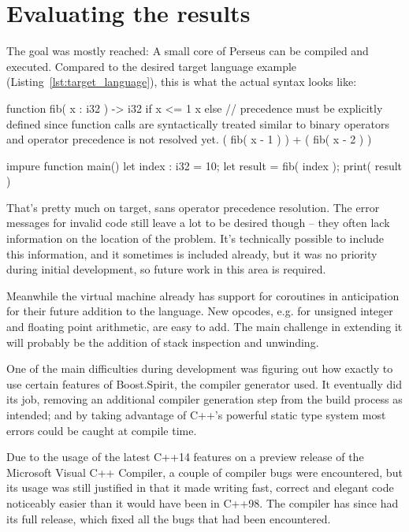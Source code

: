 \chapter{Evaluating the results}

The goal was mostly reached: A small core of Perseus can be compiled and executed. Compared to the desired target language example (Listing~\ref{lst:target_language}), this is what the actual syntax looks like:

\begin{perseuslisting}[caption={Actual resulting language example},label={lst:result_language}]
function fib( x : i32 ) -> i32
    if x <= 1
        x
    else
    	// precedence must be explicitly defined since function calls are syntactically treated similar to binary operators and operator precedence is not resolved yet.
        ( fib( x - 1 ) ) + ( fib( x - 2 ) )

impure function main()
{
	let index : i32 = 10;
	let result = fib( index );
	print( result )
}
\end{perseuslisting}

That's pretty much on target, sans operator precedence resolution. The error messages for invalid code still leave a lot to be desired though -- they often lack information on the location of the problem. It's technically possible to include this information, and it sometimes is included already, but it was no priority during initial development, so future work in this area is required.

Meanwhile the virtual machine already has support for coroutines in anticipation for their future addition to the language. New opcodes, e.g. for unsigned integer and floating point arithmetic, are easy to add. The main challenge in extending it will probably be the addition of stack inspection and unwinding.

One of the main difficulties during development was figuring out how exactly to use certain features of Boost.Spirit, the compiler generator used. It eventually did its job, removing an additional compiler generation step from the build process as intended; and by taking advantage of C++'s powerful static type system most errors could be caught at compile time.

Due to the usage of the latest C++14 features on a preview release of the Microsoft Visual C++ Compiler, a couple of compiler bugs were encountered, but its usage was still justified in that it made writing fast, correct and elegant code noticeably easier than it would have been in C++98. The compiler has since had its full release, which fixed all the bugs that had been encountered.

